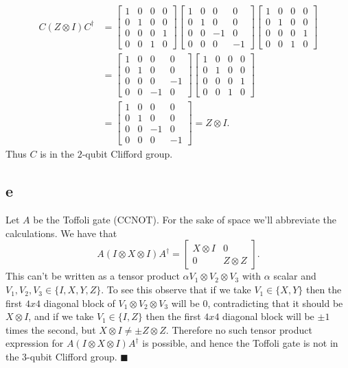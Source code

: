 \documentclass[letterpaper,12pt,oneside,onecolumn]{article}
\begin{document}
 \begin{align*}
 C(Z\otimes I)C^\dagger &=  \begin{bmatrix} 1 & 0 & 0 & 0 \\ 0 & 1 & 0 & 0 \\ 0 & 0 & 0 &1 \\ 0& 0& 1 & 0 \end{bmatrix} \begin{bmatrix}1 &0 &0 &0 \\0 & 1 & 0 &0 \\ 0 &0 &-1 & 0\\ 0 &0 &0 & -1 \end{bmatrix}  \begin{bmatrix} 1 & 0 & 0 & 0 \\ 0 & 1 & 0 & 0 \\ 0 & 0 & 0 &1 \\ 0& 0& 1 & 0 \end{bmatrix}\\
 &= \begin{bmatrix} 1& 0 & 0 &0 \\0 &1 & 0 &0 \\ 0 & 0 &0 &-1 \\ 0 & 0 & -1 &0\end{bmatrix} \begin{bmatrix} 1 & 0 & 0 & 0 \\ 0 & 1 & 0 & 0 \\ 0 & 0 & 0 &1 \\ 0& 0& 1 & 0 \end{bmatrix}\\
 &= \begin{bmatrix} 1 & 0 &0 &0 \\ 0 &1 & 0 &0\\ 0 & 0 &-1 & 0 \\ 0 & 0 & 0 & -1 \end{bmatrix} = Z\otimes I.
 \end{align*}
 Thus $C$ is in the $2$-qubit Clifford group.
 \subsection{e}
 Let $A$ be the Toffoli gate (CCNOT). For the sake of space we'll abbreviate the calculations. We have that
 $$A(I\otimes X\otimes I) A^\dagger = \begin{bmatrix} X\otimes I & 0 \\ 0 & Z\otimes Z\end{bmatrix}.$$
 This can't be written as a tensor product $\alpha V_1\otimes V_2 \otimes V_3$ with $\alpha$ scalar and $V_1,V_2, V_3 \in \{I,X,Y,Z\}$. To see this observe that if we take $V_1 \in  \{X, Y\}$ then the first $4x4$ diagonal block of $V_1\otimes V_2 \otimes V_3$ will be $0$, contradicting that it should be $X \otimes I$, and if we take $V_1 \in \{I,Z\}$ then the first $4x4$ diagonal block will be $\pm1$ times the second, but $X\otimes I \neq \pm Z\otimes Z$. Therefore no such tensor product expression for $A(I\otimes X \otimes I)A^\dagger$ is possible, and hence the Toffoli gate is not in the $3$-qubit Clifford group. $\blacksquare$
\end{document}
